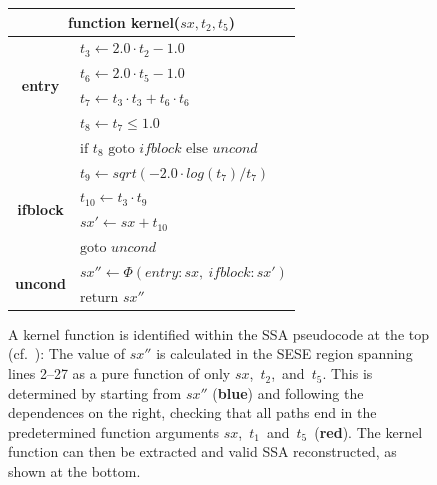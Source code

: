 \begin{figure}[p]
\begin{tabular}{|cl|}
\multicolumn{2}{c}{{\bf function} kernel($sx, t_2, t_5$)}\\
\hline
\multirow{4}{*}{\bf entry\vspace{0.5mm}}
 & $t_3 \leftarrow 2.0\cdot t_2-1.0$\\[-1.7mm]
 & $t_6 \leftarrow 2.0\cdot t_5-1.0$\\[-1.7mm]
 & $t_7 \leftarrow t_3\cdot t_3+t_6\cdot t_6$\\[-1.7mm]
 & $t_8 \leftarrow t_7\leq 1.0$\\[-1.7mm]
 & $\text{if }t_8\text{ goto }ifblock\text{ else }uncond$\\
\hline
\multirow{4}{*}{\bf ifblock\vspace{4mm}}
 & $t_9\leftarrow sqrt(-2.0\cdot log(t_7) / t_7)$\\[-1.7mm]
 & $t_{10}\leftarrow t_3\cdot t_9$\\[-1.7mm]
 & $sx'\leftarrow sx+t_{10}$\\[-1.7mm]
 & $\text{goto }uncond$\\
\hline
\multirow{2}{*}{\bf uncond\vspace{2mm}}
 & $sx''\leftarrow\Phi(entry:sx,\ ifblock:sx')$\\[-1.7mm]
 & $\text{return }sx''$\\
\hline
\end{tabular}
\caption{A kernel function is identified within the SSA pseudocode at the top
    (cf.\ ):
    The value of $sx''$ is calculated in the SESE region spanning lines 2--27
    as a pure function of only \mbox{$sx$, $t_2$, and $t_5$}.
    This is determined by starting from $sx''$
    (\textcolor{color_keywords}{\bf blue}) and following the dependences on the
    right, checking that all paths end in the predetermined function arguments
    \mbox{$sx$, $t_1$ and $t_5$ (\textcolor{color_types}{\bf red})}.
    The kernel function can then be extracted and valid SSA
    reconstructed, as shown at the bottom.
    \parfillskip=0pt}
\label{kernelexample}
\end{figure}

